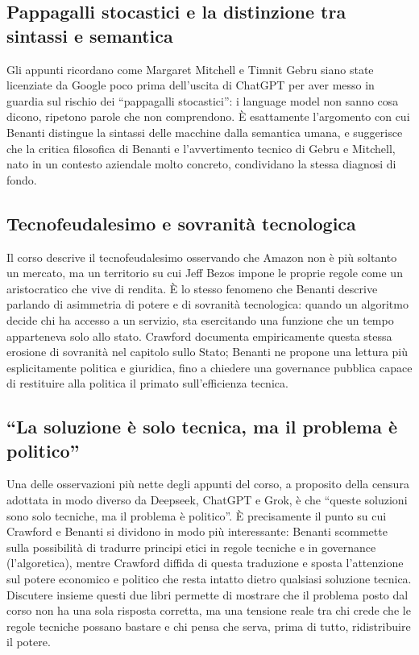 \documentclass[a4paper,11pt]{article}
\begin{document}
\subsection{Pappagalli stocastici e la distinzione tra sintassi e semantica}

Gli appunti ricordano come Margaret Mitchell e Timnit Gebru siano state licenziate da Google poco prima dell'uscita di ChatGPT per aver messo in guardia sul rischio dei ``pappagalli stocastici'': i language model non sanno cosa dicono, ripetono parole che non comprendono. È esattamente l'argomento con cui Benanti distingue la sintassi delle macchine dalla semantica umana, e suggerisce che la critica filosofica di Benanti e l'avvertimento tecnico di Gebru e Mitchell, nato in un contesto aziendale molto concreto, condividano la stessa diagnosi di fondo.

\subsection{Tecnofeudalesimo e sovranità tecnologica}

Il corso descrive il tecnofeudalesimo osservando che Amazon non è più soltanto un mercato, ma un territorio su cui Jeff Bezos impone le proprie regole come un aristocratico che vive di rendita. È lo stesso fenomeno che Benanti descrive parlando di asimmetria di potere e di sovranità tecnologica: quando un algoritmo decide chi ha accesso a un servizio, sta esercitando una funzione che un tempo apparteneva solo allo stato. Crawford documenta empiricamente questa stessa erosione di sovranità nel capitolo sullo Stato; Benanti ne propone una lettura più esplicitamente politica e giuridica, fino a chiedere una governance pubblica capace di restituire alla politica il primato sull'efficienza tecnica.

\subsection{``La soluzione è solo tecnica, ma il problema è politico''}

Una delle osservazioni più nette degli appunti del corso, a proposito della censura adottata in modo diverso da Deepseek, ChatGPT e Grok, è che ``queste soluzioni sono solo tecniche, ma il problema è politico''. È precisamente il punto su cui Crawford e Benanti si dividono in modo più interessante: Benanti scommette sulla possibilità di tradurre principi etici in regole tecniche e in governance (l'algoretica), mentre Crawford diffida di questa traduzione e sposta l'attenzione sul potere economico e politico che resta intatto dietro qualsiasi soluzione tecnica. Discutere insieme questi due libri permette di mostrare che il problema posto dal corso non ha una sola risposta corretta, ma una tensione reale tra chi crede che le regole tecniche possano bastare e chi pensa che serva, prima di tutto, ridistribuire il potere.
\end{document}
